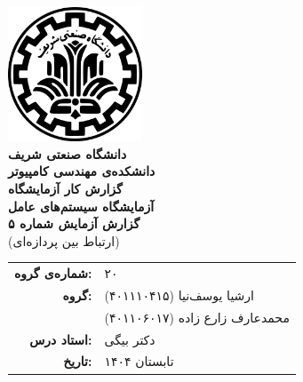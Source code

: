 \documentclass[12pt]{article}
\newcommand{\persianordinal}[1]{%
	\ifcase#1
	\or اول%
	\or دوم%
	\or سوم%
	\or چهارم%
	\or پنجم%
	\or ششم%
	\or هفتم%
	\or هشتم%
	\or نهم%
	\or دهم%
	\or یازدهم%
	\or دوازدهم%
	\or سیزدهم%
	\or چهاردهم%
	\or پانزدهم%
	\or شانزدهم%
	\or هفدهم%
	\or هجدهم%
	\or نوزدهم%
	\or بیستم%
	\else #1\fi
}
\newcommand{\persianordinalpage}{\persianfont\persianordinal{\value{page}}}
\begin{document}
	
	\begin{titlepage}
		\centering
		\vspace*{1cm}
		\includegraphics[width=4cm]{sharif.png}\\[1.5cm]
		{\Large\textbf{دانشگاه صنعتی شریف}}\\[0.5cm]
		{\large\textbf{دانشکده‌ی مهندسی کامپیوتر}}\\[1.5cm]
		{\Huge\textbf{گزارش کار آزمایشگاه}}\\[0.5cm]
		{\LARGE\textbf{آزمایشگاه سیستم‌های عامل}}\\[2cm]
		
		\textbf{گزارش آزمایش شماره ۵}\\
		(ارتباط بین پردازه‌ای)
		
		\vfill
		\begin{tabular}{rl}
			\textbf{شماره‌ی گروه:} & ۲۰ \\
			\textbf{گروه:} &
			ارشیا یوسف‌نیا (۴۰۱۱۱۰۴۱۵) \\
			& محمدعارف زارع زاده (۴۰۱۱۰۶۰۱۷) \\
			\textbf{استاد درس:} & دکتر بیگی \\
			\textbf{تاریخ:} & تابستان ۱۴۰۴ \\
		\end{tabular}
	\end{titlepage}
	
	\clearpage
	\setcounter{page}{1}
	\renewcommand{\thepage}{\persianordinalpage}
	
	\tableofcontents
	\clearpage
	\listoffigures
	\clearpage
	\listoftables
	
	\clearpage
	\setcounter{page}{1}
	\renewcommand{\thepage}{\persianfont\arabic{page}}
	
	
	
\end{document}
